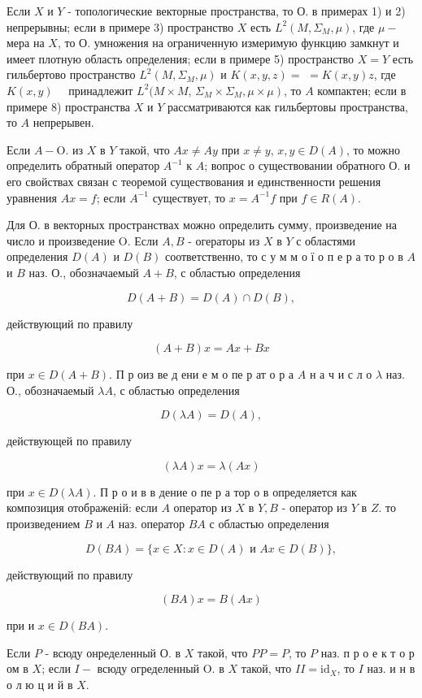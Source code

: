 \documentclass[10pt]{article}
\begin{document}
Если $X$ и $Y$ - топологические векторные пространства, то О. в примерах 1) и 2) непрерывны; если в примере 3) пространство $X$ есть $L^{2}\left(M, \Sigma_{M}, \mu\right)$, где $\mu-$ мера на $X$, то $О$. умножения на ограниченную измеримую функцию замкнут и имеет плотную область определения; если в примере 5) пространство $X=Y$ есть гильбертово пространство $L^{2}\left(M, \Sigma_{M}, \mu\right)$ и $K(x, y, z)=$ $=K(x, y) z$, где $K(x, y) \quad$ принадлежит $L^{2}(M \times M$, $\left.\Sigma_{M} \times \Sigma_{M}, \mu \times \mu\right)$, то $A$ компактен; если в примере 8) пространства $X$ и $Y$ рассматриваются как гильбертовы пространства, то $A$ непрерывен.

Если $A-\mathrm{O}$. из $X$ в $Y$ такой, что $A x \neq A y$ при $x \neq y$, $x, y \in D(A)$, то можно определить обратный оператор $A^{-1}$ к $A$; вопрос о существовании обратного О. и его свойствах связан с теоремой существования и единственности решения уравнения $A x=f$; если $A^{-1}$ существует, то $x=A^{-1} f$ при $f \in R(A)$.

Для О. в векторных пространствах можно определить сумму, произведение на число и произведение $\mathrm{O}$. Если $A, B$ - огераторы из $X$ в $Y$ с областями определения $D(A)$ и $D(B)$ соответственно, то с у м м о ї о п е р а то р о в $A$ и $B$ наз. О., обозначаемый $A+B$, с областью определения

\[
D(A+B)=D(A) \cap D(B),
\]

действующий по правилу

\[
(A+B) x=A x+B x
\]

при $x \in D(A+B)$. П р оиз ве д ени е м о пе р ат о р а $A$ н а ч и с л о $\lambda$ наз. О., обозначаемый $\lambda A$, с областью определения

\[
D(\lambda A)=D(A),
\]

действующей по правилу

\[
(\lambda A) x=\lambda(A x)
\]

при $x \in D(\lambda A)$. П р о и в в дение о пе р а тор о в определяется как композиция отображеній: если $A$ оператор из $X$ в $Y, B$ - оператор из $Y$ в $Z$. то произведением $B$ и $A$ наз. оператор $B A$ с областью определения

\[
D(B A)=\{x \in X: x \in D(A) \text { и } A x \in D(B)\},
\]

действующий по правилу

\[
(B A) x=B(A x)
\]

при и $x \in D(B A)$.

Если $P$ - всюду онределенный О. в $X$ такой, что $P P=P$, то $P$ наз. п р о е к т о р ом в $X$; если $I-$ всюду огределенный $\mathrm{O}$. в $X$ такой, что $I I=\mathrm{id}_{X}$, то $I$ наз. и н в о л ю ц и й в $X$.
\end{document}
